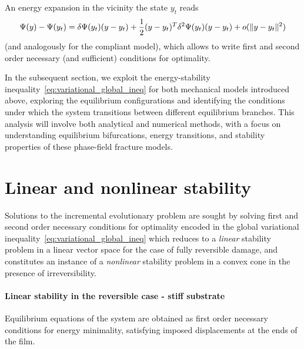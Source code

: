 \documentclass[10pt]{article}
\begin{document}
An energy expansion in the vicinity the state $y_t$ reads
$$
\Psi(y)-\Psi(y_t)= \delta\Psi(y_t)(y-y_t)+\frac{1}{2}(y-y_t)^T \delta^2\Psi(y_t)(y-y_t)+o(\|y-y_t\|^2)
    \label{eqn:energy-expansion}
$$
%
(and analogously for the compliant model), which allows to write first and second order necessary (and sufficient) conditions for optimality.


%

%

In the subsequent section, we exploit the energy-stability inequality~\eqref{eq:variational_global_ineq} for both mechanical models introduced above, exploring the equilibrium configurations and identifying the conditions under which the system transitions between different equilibrium branches. 
This analysis will involve both analytical and numerical methods, with a focus on understanding equilibrium bifurcations, energy transitions, and stability properties of these phase-field fracture models.



%
%

%


%

\section{Linear and nonlinear stability}
\label{sec:stability}

Solutions to the incremental evolutionary problem are sought by solving first and second order necessary conditions for optimality encoded in the global variational inequality~\eqref{eq:variational_global_ineq} which reduces to a \emph{linear} stability problem in a linear vector space for the case of fully reversible damage, and constitutes an instance of a \emph{nonlinear} stability problem in a convex cone in the presence of irreversibility.

\paragraph{Linear stability in the reversible case - stiff substrate}

%
%
%


%

Equilibrium equations of the system are obtained as first order necessary conditions for energy minimality, satisfying imposed displacements at the ends of the film.
\end{document}
